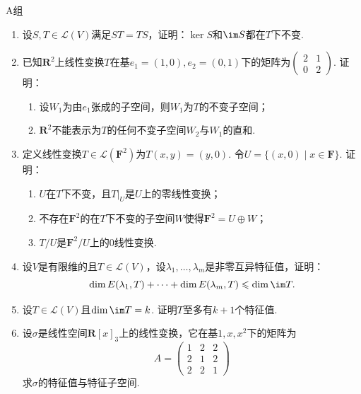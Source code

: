 \centerline{\heiti A组}
\begin{enumerate}
    \item 设$S,T\in \mathcal{L}(V)$满足$ST=TS$，证明：$\ker S$和$\im S$都在$T$下不变.

    \item 已知$\mathbf{R}^2$上线性变换$T$在基$e_1=(1,0),e_2=(0,1)$下的矩阵为$\begin{pmatrix}2 & 1 \\ 0 & 2\end{pmatrix}$. 证明：
          \begin{enumerate}
              \item 设$W_1$为由$e_1$张成的子空间，则$W_1$为$T$的不变子空间；

              \item $\mathbf{R}^2$不能表示为$T$的任何不变子空间$W_2$与$W_1$的直和.
          \end{enumerate}

    \item 定义线性变换$T\in \mathcal{L}(\mathbf{F}^2)$为$T(x,y)=(y,0)$. 令$U=\{(x,0) \mid x\in\mathbf{F}\}$. 证明：
          \begin{enumerate}
              \item $U$在$T$下不变，且$T|_{U}$是$U$上的零线性变换；

              \item 不存在$\mathbf{F}^2$的在$T$下不变的子空间$W$使得$\mathbf{F}^2=U\oplus W$；

              \item $T/U$是$\mathbf{F}^2/U$上的0线性变换.
          \end{enumerate}

    \item 设$V$是有限维的且$T\in \mathcal{L}(V)$，设$\lambda_1,\ldots,\lambda_m$是非零互异特征值，证明：
          \[ \dim E(\lambda_1,T)+\cdots+\dim E(\lambda_m,T)\leqslant\dim\im T. \]

    \item 设$T\in \mathcal{L}(V)$且$\dim\im T=k$. 证明$T$至多有$k+1$个特征值.

    \item 设$\sigma$是线性空间$\mathbf{R}[x]_3$上的线性变换，它在基$1,x,x^2$下的矩阵为
          \[ A=\begin{pmatrix}
                  1 & 2 & 2 \\ 2 & 1 & 2 \\ 2 & 2 & 1
              \end{pmatrix}\]
          求$\sigma$的特征值与特征子空间.


\end{enumerate}
